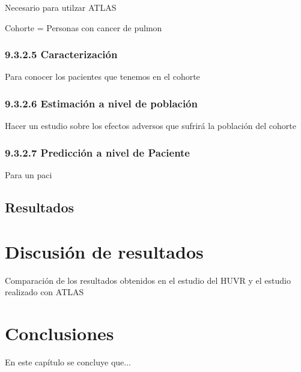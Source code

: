 Necesario para utilzar ATLAS

Cohorte = Personas con cancer de pulmon

\subsubsection{9.3.2.5 Caracterización}

Para conocer los pacientes que tenemos en el cohorte

\subsubsection{9.3.2.6 Estimación a nivel de población}

Hacer un estudio sobre los efectos adversos que sufrirá la población del cohorte

\subsubsection{9.3.2.7 Predicción a nivel de Paciente}

Para un paci

\subsection{Resultados}


\section{Discusión de resultados} \label{sec:09resultados}


Comparación de los resultados obtenidos en el estudio del HUVR y el estudio realizado con ATLAS


\section{Conclusiones} \label{sec:09conclusiones}

En este capítulo se concluye que...